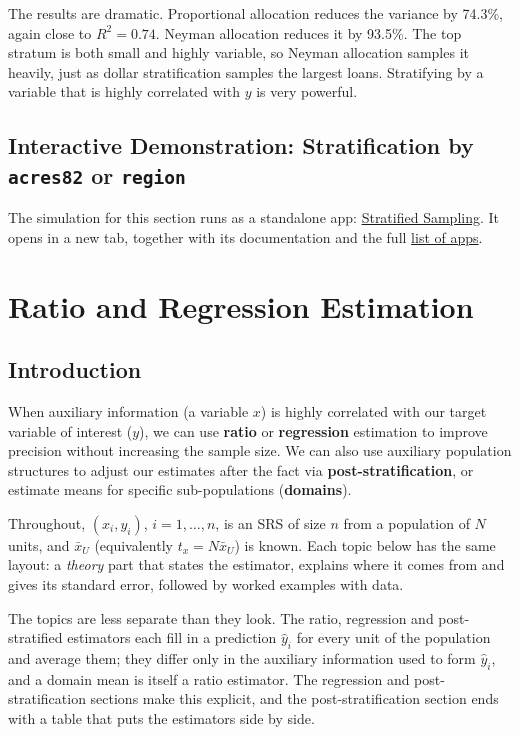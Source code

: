 \documentclass[
  letterpaper,
  DIV=11,
  numbers=noendperiod]{scrreprt}
\renewcommand{\[}{\begin{equation}}
\renewcommand{\]}{\end{equation}}
\begin{document}
The results are dramatic. Proportional allocation reduces the variance
by 74.3\%, again close to \(R^2 = 0.74\). Neyman allocation reduces it
by 93.5\%. The top stratum is both small and highly variable, so Neyman
allocation samples it heavily, just as dollar stratification samples the
largest loans. Stratifying by a variable that is highly correlated with
\(y\) is very powerful.

\section{\texorpdfstring{Interactive Demonstration: Stratification by
\texttt{acres82} or
\texttt{region}}{Interactive Demonstration: Stratification by acres82 or region}}\label{sec-app-stratification}

The simulation for this section runs as a standalone app:
\href{../shinylives_sampling/app-stratified.html}{Stratified Sampling}.
It opens in a new tab, together with its documentation and the full
\href{../shinylives_sampling/index.html}{list of apps}.


\chapter{Ratio and Regression
Estimation}\label{ratio-and-regression-estimation}

\section{Introduction}\label{sec-ratio-formulas}

When auxiliary information (a variable \(x\)) is highly correlated with
our target variable of interest (\(y\)), we can use \textbf{ratio} or
\textbf{regression} estimation to improve precision without increasing
the sample size. We can also use auxiliary population structures to
adjust our estimates after the fact via \textbf{post-stratification}, or
estimate means for specific sub-populations (\textbf{domains}).

Throughout, \((x_i, y_i)\), \(i = 1, \ldots, n\), is an SRS of size
\(n\) from a population of \(N\) units, and \(\bar x_U\) (equivalently
\(t_x = N\bar x_U\)) is known. Each topic below has the same layout: a
\emph{theory} part that states the estimator, explains where it comes
from and gives its standard error, followed by worked examples with
data.

The topics are less separate than they look. The ratio, regression and
post-stratified estimators each fill in a prediction \(\hat y_i\) for
every unit of the population and average them; they differ only in the
auxiliary information used to form \(\hat y_i\), and a domain mean is
itself a ratio estimator. The regression and post-stratification
sections make this explicit, and the post-stratification section ends
with a table that puts the estimators side by side.
\end{document}
